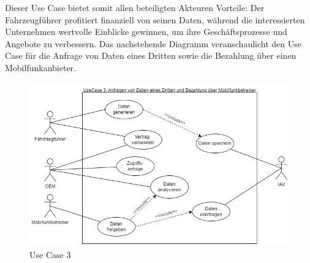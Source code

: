 \newline
Dieser Use Case bietet somit allen beteiligten Akteuren Vorteile: Der Fahrzeugführer profitiert finanziell von seinen Daten, während die interessierten Unternehmen wertvolle Einblicke gewinnen, um ihre Geschäftsprozesse und Angebote zu verbessern.
\newline
Das nachstehende Diagramm veranschaulicht den Use Case für die Anfrage von Daten eines Dritten sowie die Bezahlung über einen Mobilfunkanbieter.
\begin{figure}[H]
    \centering
    \includegraphics[scale=.6]{media/UseCase3}
    \caption{Use Case 3}
    \label{fig:UseCase3}
  \end{figure}
\label{chap:kapitel4}
